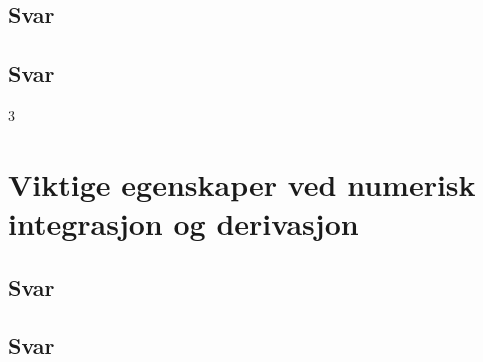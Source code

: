 \documentclass[answers,11pt]{exam}
\begin{document}
\begin{enumerate}[a)]
  \begin{tcolorbox}
    \subsection*{Svar}
    
    
  \end{tcolorbox}


  
  

  \newpage
    

  \begin{tcolorbox}
    \subsection*{Svar}
    
    
  \end{tcolorbox}



3 \newpage
  
  \section*{Viktige egenskaper ved numerisk integrasjon og derivasjon}

    

  \begin{tcolorbox}
    \subsection*{Svar}
    
    
  \end{tcolorbox}




  \newpage
    

  \begin{tcolorbox}
    \subsection*{Svar}
    

\end{tcolorbox}
\end{enumerate}
\end{document}
